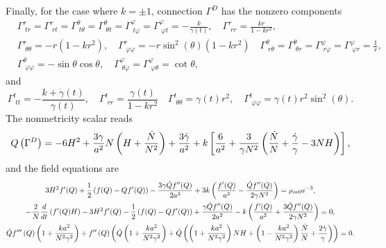 \documentclass[onecolumn,superscriptaddress,secnumarabic,nobibnotes,aps,prd,nofootinbib,altaffilletter,11pt]{revtex4}
\begin{document}
Finally, for the case where $k=\pm 1$, connection $\Gamma ^{D}$ has the
nonzero components%
\begin{equation}
\begin{split}
& \Gamma _{\;tr}^{r}=\Gamma _{\;rt}^{r}=\Gamma _{\;t\theta }^{\theta
}=\Gamma _{\;\theta t}^{\theta }=\Gamma _{\;t\varphi }^{\varphi }=\Gamma
_{\;\varphi t}^{\varphi }=-\frac{k}{\gamma (t)},\quad \Gamma _{\;rr}^{r}=%
\frac{kr}{1-kr^{2}}, \\
& \Gamma _{\;\theta \theta }^{r}=-r\left( 1-kr^{2}\right) ,\quad \Gamma
_{\;\varphi \varphi }^{r}=-r\sin ^{2}(\theta )\left( 1-kr^{2}\right) \quad
\Gamma _{\;r\theta }^{\theta }=\Gamma _{\;\theta r}^{\theta }=\Gamma
_{\;r\varphi }^{\varphi }=\Gamma _{\;\varphi r}^{\varphi }=\frac{1}{r}, \\
& \Gamma _{\;\varphi \varphi }^{\theta }=-\sin \theta \cos \theta ,\quad
\Gamma _{\;\theta \varphi }^{\varphi }=\Gamma _{\;\varphi \theta }^{\varphi
}=\cot \theta ,
\end{split}%
\end{equation}%
and%
\begin{equation*}
\Gamma _{\;tt}^{t}=-\frac{k+\dot{\gamma}(t)}{\gamma (t)},\quad \Gamma
_{\;rr}^{t}=\frac{\gamma (t)}{1-kr^{2}}\quad \Gamma _{\;\theta \theta
}^{t}=\gamma (t)r^{2},\quad \Gamma _{\;\varphi \varphi }^{t}=\gamma
(t)r^{2}\sin ^{2}(\theta ).
\end{equation*}%
The nonmetricity scalar reads %
\begin{equation}
Q\left( \Gamma ^{D}\right) =-6H^{2}+\frac{3\gamma }{a^{2}}N\left( H+\frac{%
\dot{N}}{N^{2}}\right) +\frac{3\dot{\gamma}}{a^{2}}+k\left[ \frac{6}{a^{2}}+%
\frac{3}{\gamma N^{2}}\left( \frac{\dot{N}}{N}+\frac{\dot{\gamma}}{\gamma }%
-3NH\right) \right] ,
\end{equation}%
and the field equations are%
\begin{gather}
3H^{2}f^{\prime }(Q)+\frac{1}{2}\left( f(Q)-Qf^{\prime }(Q)\right) -\frac{%
3\gamma \dot{Q}f^{\prime \prime }(Q)}{2a^{2}}+3k\left( \frac{f^{\prime }(Q)}{%
a^{2}}-\frac{\dot{Q}f^{\prime \prime }(Q)}{2\gamma N^{2}}\right)  =  \rho _{m0}a^{-3}, \\
-\frac{2}{N}\frac{d}{dt}\left( f^{\prime }(Q)H\right) -3H^{2}f^{\prime }(Q)-%
\frac{1}{2}\left( f(Q)-Qf^{\prime }(Q)\right) +\frac{\gamma \dot{Q}f^{\prime
\prime }(Q)}{2a^{2}}-k\left( \frac{f^{\prime }(Q)}{a^{2}}+\frac{3\dot{Q}%
f^{\prime \prime }(Q)}{2\gamma N^{2}}\right) = 0, \\
\dot{Q}f^{\prime \prime \prime }\left( Q\right) \left( 1+\frac{ka^{2}}{%
N^{2}\gamma ^{2}}\right) +f^{\prime \prime }\left( Q\right) \left( \ddot{Q}%
\left( 1+\frac{ka^{2}}{N^{2}\gamma ^{2}}\right) +\dot{Q}\left( \left( 1+%
\frac{ka^{2}}{N^{2}\gamma ^{2}}\right) NH+\left( 1-\frac{ka^{2}}{N^{2}\gamma
^{2}}\right) \frac{\dot{N}}{N}+\frac{2\dot{\gamma}}{\gamma }\right) \right) = 0.
\end{gather}
\end{document}
